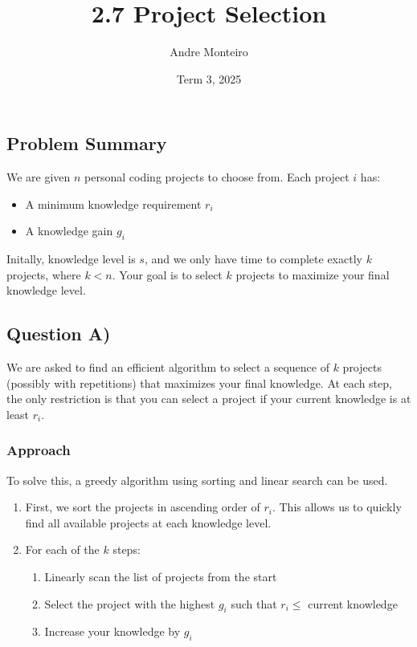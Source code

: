 \documentclass[12pt]{article}
\title{2.7 Project Selection}
\author{Andre Monteiro}
\date{Term 3, 2025}
\begin{document}
\maketitle
\newpage

\subsection*{Problem Summary}

We are given $n$ personal coding projects to choose from. Each project $i$ has:
\begin{itemize}
    \item A minimum knowledge requirement $r_i$
    \item A knowledge gain $g_i$
\end{itemize}

Initally, knowledge level is $s$, and we only have time to complete exactly $k$ projects, where $k < n$. Your goal is to select $k$ projects to maximize your final knowledge level.

\newpage

\subsection*{Question A)}

We are asked to find an efficient algorithm to select a sequence of $k$ projects (possibly with repetitions) that maximizes your final knowledge. At each step, the only restriction is that you can select a project if your current knowledge is at least $r_i$.

\subsubsection*{Approach}

To solve this, a greedy algorithm using sorting and linear search can be used.

\begin{enumerate}
    \item First, we sort the projects in ascending order of $r_i$. This allows us to quickly find all available projects at each knowledge level.
    \item For each of the $k$ steps:
    \begin{enumerate}
        \item Linearly scan the list of projects from the start
        \item Select the project with the highest $g_i$ such that $r_i \leq$ current knowledge
        \item Increase your knowledge by $g_i$
    \end{enumerate}
\end{enumerate}
\end{document}
